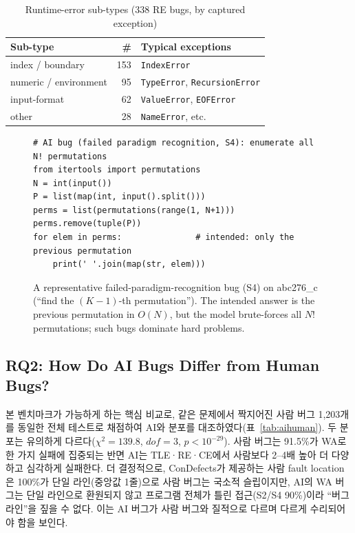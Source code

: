 \documentclass[10pt,conference]{IEEEtran}
\begin{document}
\begin{table}[t]
\caption{Runtime-error sub-types (338 RE bugs, by captured exception)}
\label{tab:re}
\centering
\begin{tabular}{lrl}
\toprule
Sub-type & \# & Typical exceptions \\
\midrule
index / boundary     & 153 & \texttt{IndexError} \\
numeric / environment & 95 & \texttt{TypeError}, \texttt{RecursionError} \\
input-format         & 62  & \texttt{ValueError}, \texttt{EOFError} \\
other                & 28  & \texttt{NameError}, etc. \\
\bottomrule
\end{tabular}
\end{table}

\begin{figure}[t]
\footnotesize
\begin{lstlisting}
# AI bug (failed paradigm recognition, S4): enumerate all N! permutations
from itertools import permutations
N = int(input())
P = list(map(int, input().split()))
perms = list(permutations(range(1, N+1)))
perms.remove(tuple(P))
for elem in perms:               # intended: only the previous permutation
    print(' '.join(map(str, elem)))
\end{lstlisting}
\caption{A representative failed-paradigm-recognition bug (S4) on abc276\_c (``find the $(K{-}1)$-th permutation''). The intended answer is the previous permutation in $O(N)$, but the model brute-forces all $N!$ permutations; such bugs dominate hard problems.}
\label{fig:example3}
\end{figure}

\subsection{RQ2: How Do AI Bugs Differ from Human Bugs?}
본 벤치마크가 가능하게 하는 핵심 비교로, 같은 문제에서 짝지어진 사람 버그 1{,}203개를 동일한 전체 테스트로 채점하여 AI와 분포를 대조하였다(표~\ref{tab:aihuman}). 두 분포는 유의하게 다르다($\chi^2=139.8$, $\mathit{dof}=3$, $p<10^{-29}$). 사람 버그는 91.5\%가 WA로 한 가지 실패에 집중되는 반면 AI는 TLE·RE·CE에서 사람보다 2{--}4배 높아 더 다양하고 심각하게 실패한다. 더 결정적으로, ConDefects가 제공하는 사람 fault location은 100\%가 단일 라인(중앙값 1줄)으로 사람 버그는 국소적 슬립이지만, AI의 WA 버그는 단일 라인으로 환원되지 않고 프로그램 전체가 틀린 접근(S2/S4 90\%)이라 ``버그 라인''을 짚을 수 없다. 이는 AI 버그가 사람 버그와 질적으로 다르며 다르게 수리되어야 함을 보인다.
\end{document}
